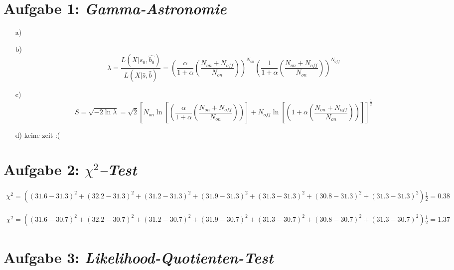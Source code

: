 
\section*{Aufgabe 1: \emph{Gamma-Astronomie}}
\begin{itemize}
\item[a)]
\item[b)] 
\begin{equation}
\lambda = \frac{L(X|s_0 , \hat{b_0})}{L(X|\hat{s},\hat{b})} = \left( \frac{\alpha}{1+\alpha} \left( \frac{N_{on}+N_{off}}{N_{on}} \right) \right)^{N_{on}} \left( \frac{1}{1+\alpha} \left( \frac{N_{on}+N_{off}}{N_{on}} \right) \right)^{N_{off}}
\end{equation}
\item[c)]
\begin{equation}
S=\sqrt{-2\ln\lambda} = \sqrt{2}\left[ N_{on} \ln\left[\left( \frac{\alpha}{1+\alpha} \left( \frac{N_{on}+N_{off}}{N_{on}} \right) \right)\right] +  N_{off} \ln\left[\left( 1+\alpha \left( \frac{N_{on}+N_{off}}{N_{on}} \right) \right)\right] \right]^{\frac{1}{2}}
\end{equation}
\item[d)] keine zeit :(
\end{itemize}

\section*{Aufgabe 2: \emph{$\chi^2$--Test}}

\begin{align*}
\chi^2 = \left((31.6-31.3)^2+(32.2-31.3)^2+(31.2-31.3)^2+(31.9-31.3)^2+(31.3-31.3)^2+(30.8-31.3)^2+(31.3-31.3)^2\right)\frac{1}{2} = 0.38
\end{align*}

\begin{align*}
\chi^2 = \left((31.6-30.7)^2+(32.2-30.7)^2+(31.2-30.7)^2+(31.9-30.7)^2+(31.3-30.7)^2+(30.8-30.7)^2+(31.3-30.7)^2\right)\frac{1}{2} = 1.37
\end{align*}

\section*{Aufgabe 3: \emph{Likelihood-Quotienten-Test}}


